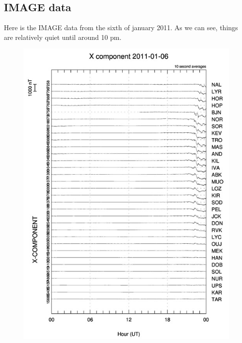 \documentclass[norsk,a4paper,11pt]{article}
\begin{document}
\begin{multicols}{2}
\subsection{IMAGE data}
Here is the IMAGE data from the sixth of january 2011. As we can see, things are relatively quiet until around 10 pm. 
\begin{figure}[H]
	\includegraphics[scale = 0.9]{Figures/X_gram.jpg}

\end{figure}
\end{multicols}
\end{document}
